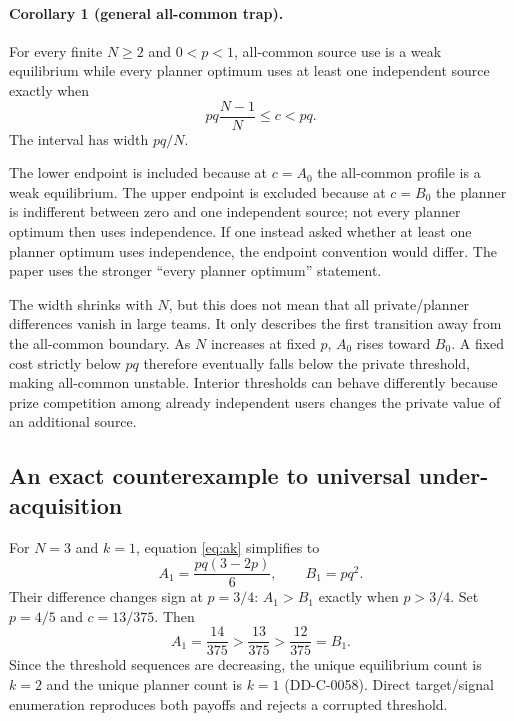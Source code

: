 \documentclass[11pt]{article}
\begin{document}
\paragraph{Corollary 1 (general all-common trap).}
For every finite $N\ge2$ and $0<p<1$, all-common source use is a weak
equilibrium while every planner optimum uses at least one independent source
exactly when
\begin{equation}
 pq\frac{N-1}{N}\le c<pq.
 \label{eq:general-trap}
\end{equation}
The interval has width $pq/N$.

The lower endpoint is included because at $c=A_0$ the all-common profile is a
weak equilibrium. The upper endpoint is excluded because at $c=B_0$ the planner
is indifferent between zero and one independent source; not every planner
optimum then uses independence. If one instead asked whether at least one
planner optimum uses independence, the endpoint convention would differ. The
paper uses the stronger ``every planner optimum'' statement.

The width shrinks with $N$, but this does not mean that all private/planner
differences vanish in large teams. It only describes the first transition away
from the all-common boundary. As $N$ increases at fixed $p$, $A_0$ rises toward
$B_0$. A fixed cost strictly below $pq$ therefore eventually falls below the
private threshold, making all-common unstable. Interior thresholds can behave
differently because prize competition among already independent users changes
the private value of an additional source.

\subsection{An exact counterexample to universal under-acquisition}

For $N=3$ and $k=1$, equation \eqref{eq:ak} simplifies to
\begin{equation}
 A_1=\frac{pq(3-2p)}{6},
 \qquad B_1=pq^2.
 \label{eq:n3-interior}
\end{equation}
Their difference changes sign at $p=3/4$: $A_1>B_1$ exactly when $p>3/4$.
Set $p=4/5$ and $c=13/375$. Then
\[
 A_1=\frac{14}{375}>\frac{13}{375}>
 \frac{12}{375}=B_1.
\]
Since the threshold sequences are decreasing, the unique equilibrium count is
$k=2$ and the unique planner count is $k=1$ (DD-C-0058). Direct target/signal
enumeration reproduces both payoffs and rejects a corrupted threshold.
\end{document}
